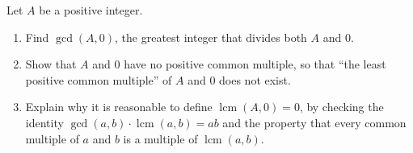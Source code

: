Let $A$ be a positive integer.
\begin{enumerate}
\item[(a)] Find $\gcd(A,0)$, the greatest integer that divides both $A$ and $0$.
\item[(b)] Show that $A$ and $0$ have no positive common multiple, so that ``the least positive common multiple'' of $A$ and $0$ does not exist.
\item[(c)] Explain why it is reasonable to define $\operatorname{lcm}(A,0)=0$, by checking the identity $\gcd(a,b)\cdot\operatorname{lcm}(a,b)=ab$ and the property that every common multiple of $a$ and $b$ is a multiple of $\operatorname{lcm}(a,b)$.
\end{enumerate}
